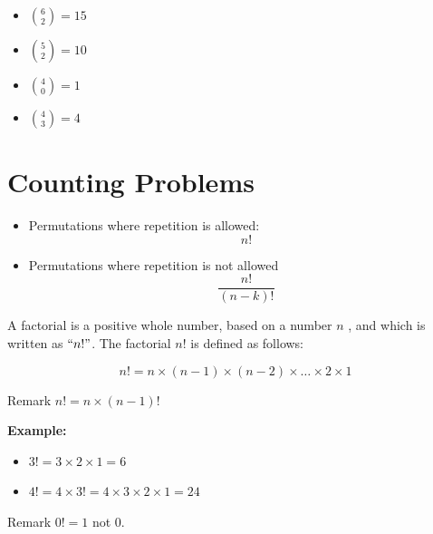 \documentclass[12pt]{report}
\begin{document}
\begin{itemize}
	\item ${6 \choose 2} = 15$
	\item ${5 \choose 2} = 10$  
	\item ${4 \choose 0} = 1$  
	\item ${4 \choose 3} = 4$  
\end{itemize}
		\section{Counting Problems}
		\large
		\begin{itemize}
			\item Permutations where repetition is allowed: 
			\[ n! \]
			\item Permutations where repetition is not allowed
			\[ \frac{n!}{(n-k)!} \]
		\end{itemize}
		
		
		

A factorial is a positive whole number, based on a number $n$ , and which is written as $``n!"$. The factorial $n!$ is defined as follows:

\[n!  =n \times (n-1) \times (n-2) \times \ldots \times 2 \times 1 \]

Remark $n!  =n \times (n-1)!$\\ \bigskip

\textbf{ Example: }

\begin{itemize}
	\item $3!  = 3 \times 2  \times 1 = 6 $
	
	\item $4!  = 4 \times 3! = 4 \times 3 \times 2 \times 1 = 24$
\end{itemize}
Remark $0! = 1$ not $0$.
\end{document}

